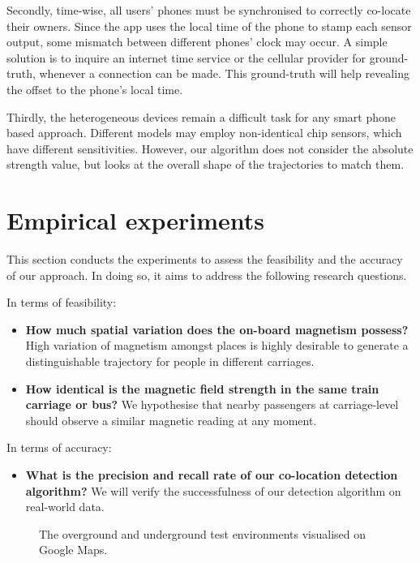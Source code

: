 \documentclass[conference]{IEEEtran}
\begin{document}
Secondly, time-wise, all users' phones must be synchronised to correctly co-locate their owners. Since the app uses the local time of the phone to stamp each sensor output, some mismatch between different phones' clock may occur. A simple solution is to inquire an internet time service or the cellular provider for ground-truth, whenever a connection can be made. This ground-truth will help revealing the offset to the phone's local time.

Thirdly, the heterogeneous devices remain a difficult task for any smart phone based approach. Different models may employ non-identical chip sensors, which have different sensitivities. However, our algorithm does not consider the absolute strength value, but looks at the overall shape of the trajectories to match them.





\section{Empirical experiments}
This section conducts the experiments to assess the feasibility and the accuracy of our approach. In doing so, it aims to address the following research questions.

In terms of feasibility:
\begin{itemize}
	\item \textbf{How much spatial variation does the on-board magnetism possess?} High variation of magnetism amongst places is highly desirable to generate a distinguishable trajectory for people in different carriages.
	\item \textbf{How identical is the magnetic field strength in the same train carriage or bus?} We hypothesise that nearby passengers at carriage-level should observe a similar magnetic reading at any moment.
\end{itemize}

In terms of accuracy:
\begin{itemize}
	\item \textbf{What is the precision and recall rate of our co-location detection algorithm?} We will verify the successfulness of our detection algorithm on real-world data.
\end{itemize}

\begin{figure}
	\centering
	
	\hfil
	\hfil
	
	\caption{The overground and underground test environments visualised on Google Maps.}
	\label{overundertest}
\end{figure}
\end{document}
